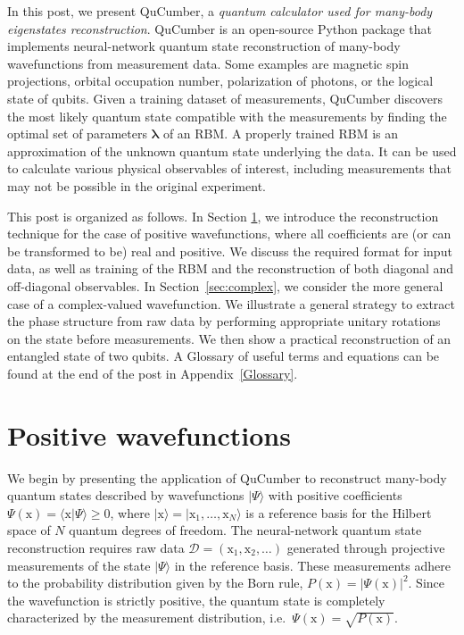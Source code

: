 \documentclass[submission, Phys, hidelnks]{SciPost}
\begin{document}
In this post, we present QuCumber, a {\it quantum calculator used for many-body eigenstates reconstruction}. QuCumber is an open-source Python package that implements neural-network quantum state reconstruction of many-body wavefunctions from measurement data. Some examples are magnetic spin projections, orbital occupation number, polarization of photons, or the logical state of qubits. Given a training dataset of measurements, QuCumber discovers the most likely quantum state compatible with the measurements by finding the optimal set of parameters $\bm{\lambda}$ of an RBM. A properly trained RBM is an approximation of the unknown quantum state underlying the data. It can be used to calculate various physical observables of interest, including measurements that may not be possible in the original experiment.

This post is organized as follows. In Section \ref{sec:positive}, we introduce the reconstruction technique for the case of positive wavefunctions, where all coefficients are (or can be transformed to be) real and positive. We discuss the required format for input data, as well as training of the RBM and the reconstruction of both diagonal and off-diagonal observables. In Section~\ref{sec:complex}, we consider the more general case of a complex-valued wavefunction. We illustrate a general strategy to extract the phase structure from raw data by performing appropriate unitary rotations on the state before measurements. We then show a practical reconstruction of an entangled state of two qubits. A Glossary of useful terms and equations can be found at the end of the post in Appendix~\ref{Glossary}.

\section{Positive wavefunctions}\label{sec:positive}
We begin by presenting the application of QuCumber to reconstruct many-body quantum states described by wavefunctions $|\Psi\rangle$ with positive coefficients $\Psi(\bm{\mathrm{x}})=\langle\bm{\mathrm{x}}|\Psi\rangle \ge0$, where $|\bm{\mathrm{x}}\rangle=|\mathrm{x}_1,\dots,\mathrm{x}_N\rangle$ is a reference basis for the Hilbert space of $N$ quantum degrees of freedom. The neural-network quantum state reconstruction requires raw data $\mathcal{D}=(\bm{\mathrm{x}}_1,\bm{\mathrm{x}}_2,\dots)$ generated through projective measurements of the state $|\Psi\rangle$ in the reference basis. These measurements adhere to the probability distribution given by the Born rule, $P(\bm{\mathrm{x}})=|\Psi(\bm{\mathrm{x}})|^2$. Since the wavefunction is strictly positive, the quantum state is completely characterized by the measurement distribution, i.e.~$\Psi(\bm{\mathrm{x}})=\sqrt{P(\bm{\mathrm{x}})}$. 
\end{document}

